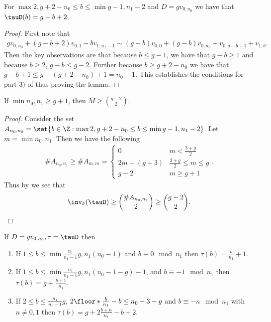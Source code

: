 \begin{lemma}\label{lem-topOffBottomOffSimple}
    For $\max{2,g+2-n_0}\leq b \leq \min{g-1,n_1-2}$ and $D = gv_{0,n_0}$ we have that $\tauD(b) = g-b+2$.
\end{lemma}

\begin{proof}
    First note that
    \begin{align*}
        gv_{0,n_0}+(g-b+2)v_{0,1}-bv_{1,n_1-1} \sim (g-b)v_{0,0}+(g-b)v_{0,n_0}+v_{0,g-b+1}+v_{1,b}.
    \end{align*}
    Then the key observations are that because $b \leq g-1$, we have that $g-b \geq 1$ and because $b \geq 2$, $g-b \leq g-2$. Further because $b\geq g+2-n_0$ we have that $g-b +1\leq g-(g+2-n_0) + 1 = n_0-1$. This establishes the conditions for part $3)$ of  thus proving the lemma.
\end{proof}

\begin{coro}\label{cor-bothOffMin}
    If $\min{n_0,n_1} \geq g+1$, then $M \geq \binom{g-2}{2}$.
\end{coro}

\begin{proof}
    Consider the set $A_{n_0,n_0} = \set{b \in \Z: \max{2,g+2-n_0}\leq b \leq \min{g-1,n_1-2}}$. Let $m = \min{n_0,n_1}$. Then we have the following
    \begin{align*}
        \#A_{n_0,n_1} \geq \#A_{m,m} = \begin{cases}
            0 & m < \frac{3+g}{2}\\
            2m-(g+3) & \frac{3+g}{2}\leq m \leq g\\
            g-2 & m\geq g+1
        \end{cases}.
    \end{align*}
    Thus by  we see that
\[
        \inv_k(\tauD) \geq \binom{\#A_{n_0,n_1}}{2} \geq \binom{g-2}{2}. \qedhere
\]
\end{proof}

\begin{lemma}\label{lem-topOffBottomOff}
    If $D = gv_{0,n_0}, \tau = \tauD$ then
    \begin{enumerate}[label = \arabic*)]
        \item If $1 \leq b \leq \min{\frac{n_1}{n_1-1}g,n_1(n_0-1)}$ and $b \equiv 0 \mod n_1$ then $\tau(b) = \frac{b}{n_1}+1$.
        \item If $1 \leq b \leq \min{\frac{n_1}{n_1-1}g,n_1(n_0-1-g)-1}$,  and $b \equiv -1 \mod n_1$ then $\tau(b) = g+\frac{b+1}{n_1}$.
        \item If $2 \leq b\leq \frac{n_1}{n_1-1}g$, $2\floor*{\frac{b}{n_1}}-b \leq n_0-3-g$ and $b \equiv -n \mod n_1$ with $n \neq 0,1$ then $\tau(b) = g+2\frac{b+n}{n_1}-b+2$.
    \end{enumerate}
\end{lemma}

